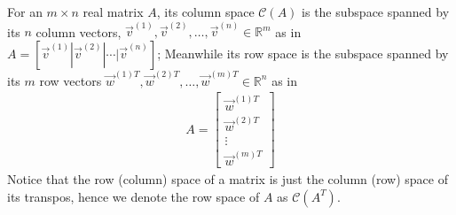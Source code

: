 \begin{defn}
\label{defn:colrowspace}
For an $m \times n$ real matrix $A$, its column space $\mathcal{C}(A)$ is the subspace spanned by its $n$ column vectors, $\vec{v}^{(1)}, \vec{v}^{(2)}, \ldots, \vec{v}^{(n)} \in \mathbb{R}^m$ as in $A = [\vec{v}^{(1)}|\vec{v}^{(2)}|\cdots|\vec{v}^{(n)}]$; Meanwhile its row space is the subspace spanned by its $m$ row vectors $\vec{w}^{(1)T}, \vec{w}^{(2)T}, \ldots, \vec{w}^{(m)T} \in \mathbb{R}^n$ as in
\begin{align*}
A = 
\left[\begin{array}{c}
\vec{w}^{(1)T} \\
\hline
\vec{w}^{(2)T} \\
\hline
\vdots \\
\hline
\vec{w}^{(m)T}
\end{array}\right]
\end{align*}
Notice that the row (column) space of a matrix is just the column (row) space of its transpos, hence we denote the row space of $A$ as $\mathcal{C}(A^T)$.
\end{defn}

